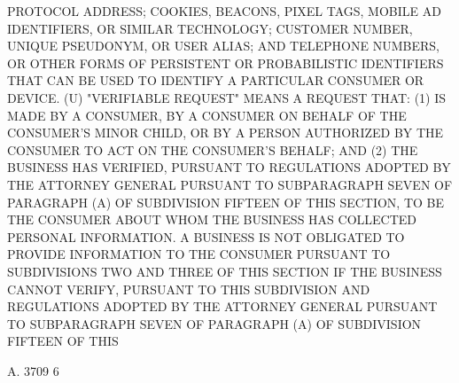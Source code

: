  PROTOCOL  ADDRESS;  COOKIES, BEACONS, PIXEL TAGS, MOBILE AD IDENTIFIERS,
 OR SIMILAR TECHNOLOGY; CUSTOMER NUMBER, UNIQUE PSEUDONYM, OR USER ALIAS;
 AND TELEPHONE NUMBERS, OR OTHER FORMS  OF  PERSISTENT  OR  PROBABILISTIC
 IDENTIFIERS  THAT  CAN  BE  USED  TO  IDENTIFY  A PARTICULAR CONSUMER OR
 DEVICE.
   (U) "VERIFIABLE REQUEST" MEANS A  REQUEST  THAT:  (1)  IS  MADE  BY  A
 CONSUMER, BY A CONSUMER ON BEHALF OF THE CONSUMER'S MINOR CHILD, OR BY A
 PERSON  AUTHORIZED  BY THE CONSUMER TO ACT ON THE CONSUMER'S BEHALF; AND
 (2) THE BUSINESS HAS VERIFIED, PURSUANT TO REGULATIONS  ADOPTED  BY  THE
 ATTORNEY  GENERAL  PURSUANT  TO  SUBPARAGRAPH  SEVEN OF PARAGRAPH (A) OF
 SUBDIVISION FIFTEEN OF THIS SECTION, TO BE THE CONSUMER ABOUT  WHOM  THE
 BUSINESS HAS COLLECTED PERSONAL INFORMATION. A BUSINESS IS NOT OBLIGATED
 TO  PROVIDE INFORMATION TO THE CONSUMER PURSUANT TO SUBDIVISIONS TWO AND
 THREE OF THIS SECTION IF THE BUSINESS CANNOT VERIFY,  PURSUANT  TO  THIS
 SUBDIVISION  AND REGULATIONS ADOPTED BY THE ATTORNEY GENERAL PURSUANT TO
 SUBPARAGRAPH SEVEN OF PARAGRAPH  (A)  OF  SUBDIVISION  FIFTEEN  OF  THIS

 A. 3709                             6
 
